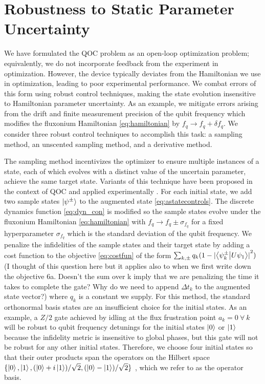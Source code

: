\section{Robustness to Static Parameter Uncertainty \label{sec:static}}
We have formulated the QOC
problem as an open-loop optimization problem; equivalently,
we do not incorporate feedback from the experiment in optimization.
However, the device typically deviates from the Hamiltonian we use in optimization,
leading to poor experimental performance. We combat errors
of this form using robust control techniques,
making the state evolution insensitive
to Hamiltonian parameter uncertainty. As an example,
we mitigate errors arising from the drift and finite measurement
precision of the qubit frequency which modifies the fluxonium Hamiltonian
\eqref{eq:hamiltonian} by $f_{q} \rightarrow f_{q} + \delta f_{q}$.
We consider three robust control techniques to accomplish this task:
a sampling method, an unscented sampling method,
and a derivative method.

The sampling method incentivizes the optimizer
to ensure multiple instances of a state, each of which evolves
with a distinct value of the uncertain parameter, achieve
the same target state. Variants of this technique have been proposed
in the context of QOC
\cite{allen2019robust, ball2020software, khaneja2005optimal,
  reinhold2019controlling, rembold2020introduction} and applied
experimentally \cite{carvalho2020error}.
For each initial state,
we add two sample states $\ket{\psi^{\pm}}$
to the augmented state \eqref{eq:astatecontrols}. The discrete dynamics
function \eqref{eq:dyn_con} is modified
so the sample states evolve under the fluxonium Hamiltonian \eqref{eq:hamiltonian}
with $f_{q} \rightarrow f_{q} \pm \sigma_{f_{q}}$ for a fixed
hyperparameter $\sigma_{f_{q}}$ which is the standard deviation of the qubit frequency.
We penalize the infidelities of the sample states and their target state
by adding a cost function to the objective \eqref{eq:costfun} of the form
$\sum_{k, \pm} q_{k} (1 - {\lvert \braket{\psi^{\pm}_{k}}{U \psi_{1}} \rvert}^{2})$
(I thought of this question here but it applies also to when we first write down the objective 6a. Doesn't the sum over k imply that we are penalizing the time it takes to complete the gate? Why do we need to append $\Delta t_{k}$ to the augmented state vector?)
where $q_{k}$ is a constant we supply.
For this method, the standard orthonormal basis states are an insufficient choice
for the initial states. As an example, a $Z/2$ gate achieved by idling
at the flux frustration point $a_{k} = 0 \ \forall \ k$
will be robust to qubit frequency detunings for the initial states $\ket{0}$
or $\ket{1}$ because the infidelity metric is insensitive to global phases,
but this gate will not be robust for any other initial states.
Therefore, we choose four initial states
so that their outer products
span the operators on the Hilbert space
$\{\ket{0}, \ket{1}, (\ket{0} + i\ket{1}) / \sqrt{2},
(\ket{0} - \ket{1}) / \sqrt{2}\}$ \cite{chow2009randomized},
which we refer to as the operator basis.

